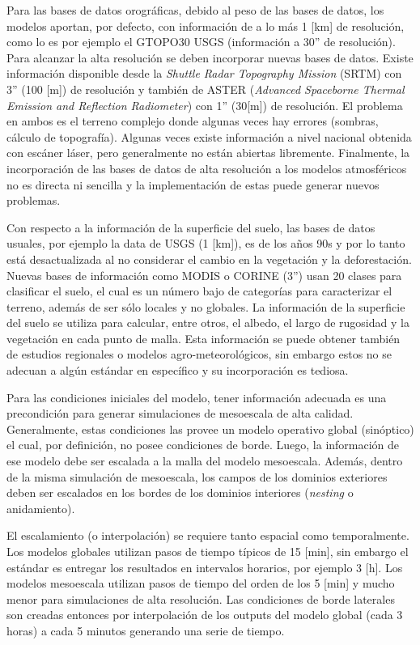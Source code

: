 Para las bases de datos orográficas, debido al peso de las bases de datos, los modelos aportan, por defecto, con información de a lo más 1 [km] de resolución, como lo es por ejemplo el GTOPO30 USGS (información a 30'' de resolución). Para alcanzar la alta resolución se deben incorporar nuevas bases de datos. Existe información disponible desde la \emph{Shuttle Radar Topography Mission} (SRTM) con 3'' (100 [m]) de resolución y también de ASTER (\emph{Advanced Spaceborne Thermal Emission and Reflection Radiometer}) con 1'' (30[m]) de resolución. El problema en ambos es el terreno complejo donde algunas veces hay errores (sombras, cálculo de topografía). Algunas veces existe información a nivel nacional obtenida con escáner láser, pero generalmente no están abiertas libremente. Finalmente, la incorporación de las bases de datos de alta resolución a los modelos atmosféricos no es directa ni sencilla y la implementación de estas puede generar nuevos problemas.

Con respecto a la información de la superficie del suelo, las bases de datos usuales, por ejemplo la data de USGS (1 [km]), es de los años 90s y por lo tanto está desactualizada al no considerar el cambio en la vegetación y la deforestación. Nuevas bases de información como MODIS o CORINE (3'') usan 20 clases para clasificar el suelo, el cual es un número bajo de categorías para caracterizar el terreno, además de ser sólo locales y no globales. La información de la superficie del suelo se utiliza para calcular, entre otros, el albedo, el largo de rugosidad y la vegetación en cada punto de malla. Esta información se puede obtener también de estudios regionales o modelos agro-meteorológicos, sin embargo estos no se adecuan a algún estándar en específico y su incorporación es tediosa.
 
Para las condiciones iniciales del modelo, tener información adecuada es una precondición para generar simulaciones de mesoescala de alta calidad. Generalmente, estas condiciones las provee un modelo operativo global (sinóptico) el cual, por definición, no posee condiciones de borde. Luego, la información de ese modelo debe ser escalada a la malla del modelo mesoescala. Además, dentro de la misma simulación de mesoescala, los campos de los dominios exteriores deben ser escalados en los bordes de los dominios interiores (\emph{nesting} o anidamiento). 

El escalamiento (o interpolación) se requiere tanto espacial como temporalmente. Los modelos globales utilizan pasos de tiempo típicos de 15 [min], sin embargo el estándar es entregar los resultados en intervalos horarios, por ejemplo 3 [h]. Los modelos mesoescala utilizan pasos de tiempo del orden de los 5 [min] y mucho menor para simulaciones de alta resolución. Las condiciones de borde laterales son creadas entonces por interpolación de los outputs del modelo global (cada 3 horas) a cada 5 minutos generando una serie de tiempo. 

